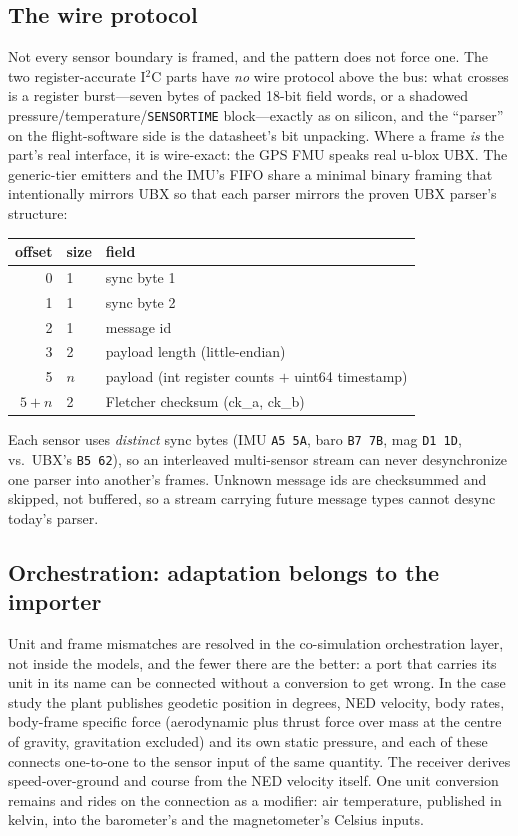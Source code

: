 \documentclass[preprint,12pt,a4paper]{elsarticle}
\newcommand{\code}[1]{\texttt{\small #1}}
\begin{document}
\subsection{The wire protocol}
Not every sensor boundary is framed, and the pattern does not force one. The
two register-accurate I$^2$C parts have \emph{no} wire protocol above the bus:
what crosses is a register burst---seven bytes of packed 18-bit field words, or
a shadowed pressure/temperature/\code{SENSORTIME} block---exactly as on silicon,
and the ``parser'' on the flight-software side is the datasheet's bit unpacking.
Where a frame \emph{is} the part's real interface, it is wire-exact: the GPS FMU
speaks real u-blox UBX. The generic-tier emitters and the IMU's FIFO share a
minimal binary framing that intentionally mirrors UBX so that each parser
mirrors the proven UBX parser's structure:
\begin{center}\footnotesize
\begin{tabular}{@{}rll@{}}
\toprule
offset & size & field\\
\midrule
0   & 1 & sync byte 1\\
1   & 1 & sync byte 2\\
2   & 1 & message id\\
3   & 2 & payload length (little-endian)\\
5   & $n$ & payload (int register counts $+$ uint64 timestamp)\\
$5{+}n$ & 2 & Fletcher checksum (ck\_a, ck\_b)\\
\bottomrule
\end{tabular}
\end{center}
Each sensor uses \emph{distinct} sync bytes (IMU \code{A5 5A}, baro \code{B7
7B}, mag \code{D1 1D}, vs.\ UBX's \code{B5 62}), so an
interleaved multi-sensor stream can never desynchronize one parser into
another's frames. Unknown message ids are checksummed and skipped, not buffered,
so a stream carrying future message types cannot desync today's parser.

\subsection{Orchestration: adaptation belongs to the importer}
\label{sec:orchestration}
Unit and frame mismatches are resolved in the co-simulation orchestration layer,
not inside the models, and the fewer there are the better: a port that carries
its unit in its name can be connected without a conversion to get wrong. In the
case study the plant publishes geodetic position in degrees, NED velocity, body
rates, body-frame specific force (aerodynamic plus thrust force over mass at
the centre of gravity, gravitation excluded) and its own static pressure, and
each of these connects one-to-one to the sensor input of the same quantity. The
receiver derives speed-over-ground and course from the NED velocity itself. One
unit conversion remains and rides on the connection as a modifier: air
temperature, published in kelvin, into the barometer's and the magnetometer's
Celsius inputs.
\end{document}
